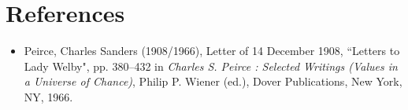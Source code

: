 \documentclass[12pt]{article}
\begin{document}
\section{References}

\begin{itemize}\item
Peirce, Charles Sanders (1908/1966), Letter of 14 December 1908, ``Letters to Lady Welby", pp. 380--432 in \textit{Charles S. Peirce : Selected Writings (Values in a Universe of Chance)}, Philip P. Wiener (ed.), Dover Publications, New York, NY, 1966.
\end{itemize}

\end{document}
